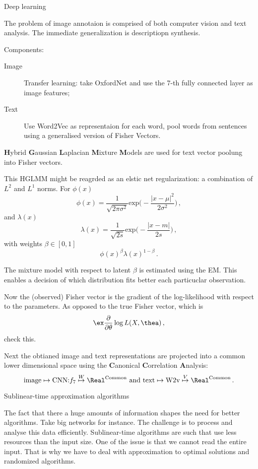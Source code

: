 Deep learning

The problem of image annotaion is comprised of both computer vision and text
analysis. The immediate generalization is descriptiopn synthesis.

Components: \begin{description}
	\item[Image] Transfer learning: take OxfordNet and use the 7-th fully connected
	layer as image features;
	\item[Text] Use Word2Vec as representaion for each word, pool words from sentences 
	using a generalised version of Fisher Vectors.
\end{description}

 \textbf{H}ybrid \textbf{G}aussian \textbf{L}aplacian \textbf{M}ixture \textbf{M}odels
are used for text vector poolung into Fisher vectors.

This HGLMM might be reagrded as an elstic net regularization: a combination of $L^2$
and $L^1$ norms. For $\phi(x)$
\[ \phi(x) = \frac{1}{\sqrt{2\pi \sigma^2}} \text{exp}\bigl(-\frac{|x-\mu|^2}{2\sigma^2}\bigr) \,, \]
and $\lambda(x)$
\[ \lambda(x) = \frac{1}{\sqrt{2 s}} \text{exp}\bigl(-\frac{|x-m|}{2s}\bigr) \,, \]
with weights $\beta\in[0,1]$
\[\phi(x)^\beta \lambda(x)^{1-\beta} \,. \]

The mixture model with respect to latent $\beta$ is estimated using the EM. This enables
a decision of which distribution fits better each particuclar observation.

Now the (observed) Fisher vector is the gradient of the log-likelihood with respect to
the parameters. As opposed to the true Fisher vector, which is 
\[ \ex \frac{\partial}{\partial \theta} \log L(X,\thea) \,, \]
check this.

Next the obtianed image and text representations are projected into a common lower
dimensional space using the \textbf{C}anonical \textbf{C}orrelation \textbf{A}nalysis:
\[
	\text{image} \mapsto \text{CNN:}f_7 \overset{W}{\mapsto} \Real^\text{Common} \text{ and }
	\text{text} \mapsto \text{W2v} \overset{V}{\mapsto} \Real^\text{Common} \,.\]


Sublinear-time approximation algorithms

The fact that there a huge amounts of information shapes the need for better algorithms.
Take big networks for instance. The challenge is to process and analyse this
data efficiently. Sublinear-time algorithms are such that use less resources than
the input size. One of the issue is that we cannot read the entire input. That is why
we have to deal with approximation to optimal solutions and randomized algorithms.

